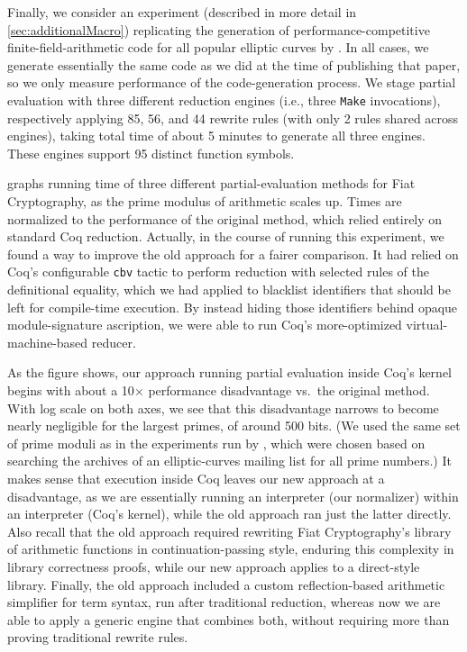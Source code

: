 Finally, we consider an experiment (described in more detail in \autoref{sec:additionalMacro}) replicating the generation of performance-competitive finite-field-arithmetic code for all popular elliptic curves by \textcite{FiatCryptoSP19}.
In all cases, we generate essentially the same code as we did at the time of publishing that paper, so we only measure performance of the code-generation process.
We stage partial evaluation with three different reduction engines (i.e., three \texttt{Make} invocations), respectively applying 85, 56, and 44 rewrite rules (with only 2 rules shared across engines), taking total time of about 5 minutes to generate all three engines.
These engines support 95 distinct function symbols.

\egroup

 graphs running time of three different partial-evaluation methods for Fiat Cryptography, as the prime modulus of arithmetic scales up.
Times are normalized to the performance of the original method, which relied entirely on standard Coq reduction.
Actually, in the course of running this experiment, we found a way to improve the old approach for a fairer comparison.
It had relied on Coq's configurable \texttt{cbv} tactic to perform reduction with selected rules of the definitional equality, which we had applied to blacklist identifiers that should be left for compile-time execution.
By instead hiding those identifiers behind opaque module-signature ascription, we were able to run Coq's more-optimized virtual-machine-based reducer.

As the figure shows, our approach running partial evaluation inside Coq's kernel begins with about a 10$\times$ performance disadvantage vs.\ the original method.
With log scale on both axes, we see that this disadvantage narrows to become nearly negligible for the largest primes, of around 500 bits.
(We used the same set of prime moduli as in the experiments run by \textcite{FiatCryptoSP19}, which were chosen based on searching the archives of an elliptic-curves mailing list for all prime numbers.)
It makes sense that execution inside Coq leaves our new approach at a disadvantage, as we are essentially running an interpreter (our normalizer) within an interpreter (Coq's kernel), while the old approach ran just the latter directly.
Also recall that the old approach required rewriting Fiat Cryptography's library of arithmetic functions in continuation-passing style, enduring this complexity in library correctness proofs, while our new approach applies to a direct-style library.
Finally, the old approach included a custom reflection-based arithmetic simplifier for term syntax, run after traditional reduction, whereas now we are able to apply a generic engine that combines both, without requiring more than proving traditional rewrite rules.

